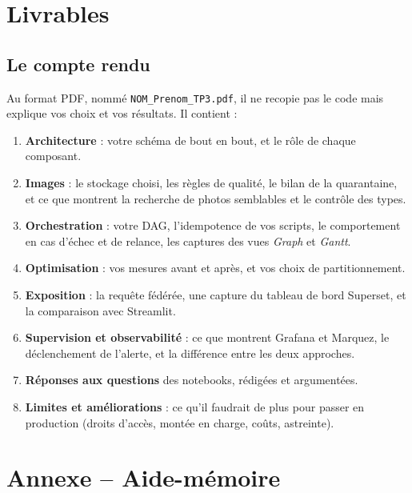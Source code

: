 \documentclass[11pt,a4paper]{article}
\newcommand{\cmd}[1]{\texttt{#1}}
\begin{document}
\section{Livrables}\label{sec:livrables}

\subsection*{Le compte rendu}

Au format PDF, nommé \cmd{NOM\_Prenom\_TP3.pdf}, il ne recopie pas le code mais explique vos choix
et vos résultats. Il contient :
\begin{enumerate}[leftmargin=*,itemsep=2pt]
  \item \textbf{Architecture} : votre schéma de bout en bout, et le rôle de chaque composant.
  \item \textbf{Images} : le stockage choisi, les règles de qualité, le bilan de la quarantaine, et ce
        que montrent la recherche de photos semblables et le contrôle des types.
  \item \textbf{Orchestration} : votre DAG, l'idempotence de vos scripts, le comportement en cas
        d'échec et de relance, les captures des vues \emph{Graph} et \emph{Gantt}.
  \item \textbf{Optimisation} : vos mesures avant et après, et vos choix de partitionnement.
  \item \textbf{Exposition} : la requête fédérée, une capture du tableau de bord Superset, et la
        comparaison avec Streamlit.
  \item \textbf{Supervision et observabilité} : ce que montrent Grafana et Marquez, le déclenchement de l'alerte,
        et la différence entre les deux approches.
  \item \textbf{Réponses aux questions} des notebooks, rédigées et argumentées.
  \item \textbf{Limites et améliorations} : ce qu'il faudrait de plus pour passer en production
        (droits d'accès, montée en charge, coûts, astreinte).
\end{enumerate}

\clearpage
\section*{Annexe -- Aide-mémoire}\label{sec:aidememoire}
\end{document}
